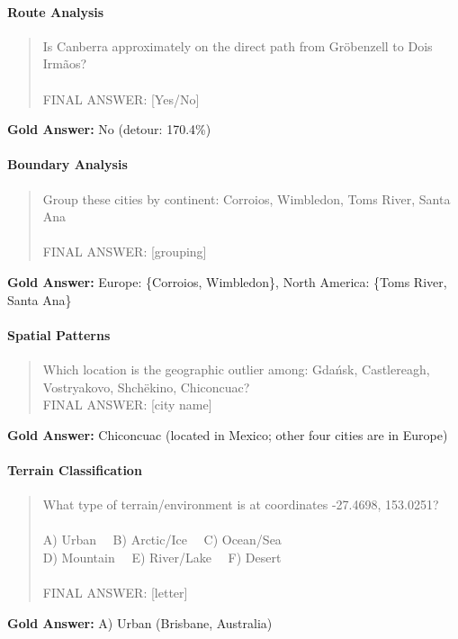 \paragraph{Route Analysis}
\begin{quote}\ttfamily\small
Is Canberra approximately on the direct path from Gr\"{o}benzell to Dois Irm\~{a}os?\\
\\
FINAL ANSWER: [Yes/No]
\end{quote}
\textbf{Gold Answer:} No (detour: 170.4\%)

\paragraph{Boundary Analysis}
\begin{quote}\ttfamily\small
Group these cities by continent: Corroios, Wimbledon, Toms River, Santa Ana\\
\\
FINAL ANSWER: [grouping]
\end{quote}
\textbf{Gold Answer:} Europe: \{Corroios, Wimbledon\}, North America: \{Toms River, Santa Ana\}

\paragraph{Spatial Patterns}
\begin{quote}\ttfamily\small
Which location is the geographic outlier among: Gda\'{n}sk, Castlereagh, Vostryakovo, Shch\"{e}kino, Chiconcuac?\\
FINAL ANSWER: [city name]
\end{quote}
\textbf{Gold Answer:} Chiconcuac (located in Mexico; other four cities are in Europe)

\paragraph{Terrain Classification}
\begin{quote}\ttfamily\small
What type of terrain/environment is at coordinates -27.4698, 153.0251?\\
\\
A) Urban ~~B) Arctic/Ice ~~C) Ocean/Sea\\
D) Mountain ~~E) River/Lake ~~F) Desert\\
\\
FINAL ANSWER: [letter]
\end{quote}
\textbf{Gold Answer:} A) Urban (Brisbane, Australia)

